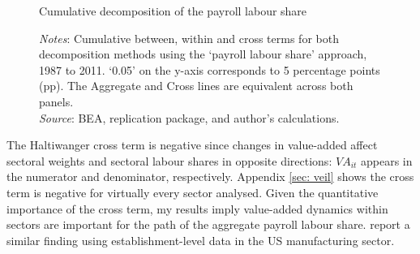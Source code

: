 

\begin{figure}[h]
  \centering
\caption{\normalsize Cumulative decomposition of the payroll labour share}
\vfill
\begin{minipage}{\linewidth}
    \caption*{\textit{Notes}: Cumulative between, within and cross terms for both decomposition methods using the `payroll labour share' approach, 1987 to 2011. `0.05' on the y-axis corresponds to 5 percentage points (pp). The Aggregate and Cross lines are equivalent across both panels. \\
    \textit{Source}: BEA, \citet{elsbyDeclineLaborShare2013a} replication package, and author's calculations.}
\end{minipage}
\label{fig:decomp_1}
\end{figure}

The Haltiwanger cross term is negative since changes in value-added affect sectoral weights and sectoral labour shares in opposite directions: $VA_{it}$ appears in the numerator and denominator, respectively. Appendix \ref{sec: veil} shows the cross term is negative for virtually every sector analysed. 
Given the quantitative importance of the cross term, my results imply value-added dynamics within sectors are important for the path of the aggregate payroll labour share. \citet{kehrigMicroLevelAnatomyLabor2021a} report a similar finding using establishment-level data in the US manufacturing sector. 


